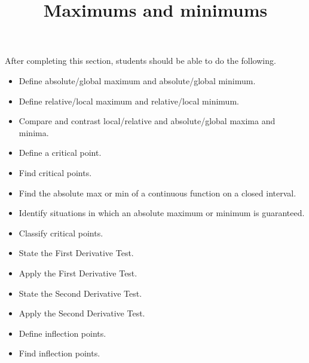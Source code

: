 \documentclass{ximera}
\title{Maximums and minimums}
\begin{document}
\begin{abstract}
\end{abstract}

\maketitle

\begin{sectionOutcomes}

After completing this section, students should be able to do the following.

\begin{itemize}
	\item Define absolute/global maximum and absolute/global minimum.
	\item Define relative/local maximum and relative/local minimum.
   	\item Compare and contrast local/relative and absolute/global maxima and minima.
    \item Define a critical point.
	\item Find critical points.
	\item Find the absolute max or min of a continuous function on a closed interval.
	\item Identify situations in which an absolute maximum or minimum is guaranteed.
	\item Classify critical points.
	\item State the First Derivative Test.
	\item Apply the First Derivative Test.
	\item State the Second Derivative Test.
	\item Apply the Second Derivative Test.
	\item Define inflection points.
	\item Find inflection points.
\end{itemize}

\end{sectionOutcomes}
\end{document}
